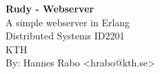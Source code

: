 \begin{titlepage}
	\thispagestyle{empty}
	
	\begin{center}
	  \vspace*{5cm}
	  
	  \huge{\textbf{Rudy - Webserver}}\\
	  \vspace{.5cm}
	  \Large{A simple webserver in Erlang}\\
	  \vspace{2.5cm}
	  \normalsize Distributed Systems ID2201\\
	  \vspace{2mm}		
	  \Large{KTH}\\
	  \vspace{6.5cm} 
	  \normalsize By: Hannes Rabo <hrabo@kth.se>
	\end{center} 
	
\end{titlepage}